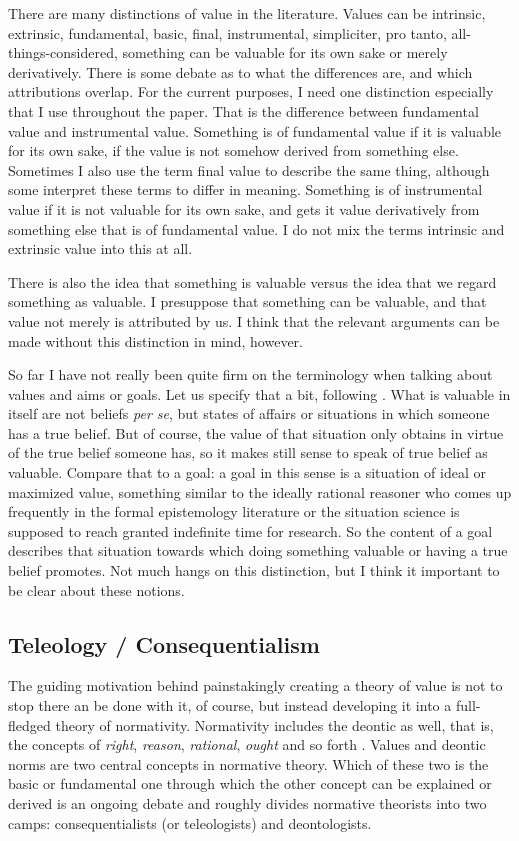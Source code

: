 \documentclass[12pt,numbers=noenddot]{scrartcl}
\begin{document}
There are many distinctions of value in the literature. Values can be intrinsic, extrinsic, fundamental, basic, final, instrumental, simpliciter, pro tanto, all-things-considered, something can be valuable for its own sake or merely derivatively. There is some debate as to what the differences are, and which attributions overlap. For the current purposes, I need one distinction especially that I use throughout the paper. That is the difference between fundamental value and instrumental value. Something is of fundamental value if it is valuable for its own sake, if the value is not somehow derived from something else. Sometimes I also use the term final value to describe the same thing, although some interpret these terms to differ in meaning. Something is of instrumental value if it is not valuable for its own sake, and gets it value derivatively from something else that is of fundamental value. I do not mix the terms intrinsic and extrinsic value into this at all.

There is also the idea that something is valuable versus the idea that we regard something as valuable. I presuppose that something can be valuable, and that value not merely is attributed by us. I think that the relevant arguments can be made without this distinction in mind, however.

So far I have not really been quite firm on the terminology when talking about values and aims or goals. Let us specify that a bit, following \textcite[344f.]{Berker2013-BERETA-2}. What is valuable in itself are not beliefs \emph{per se}, but states of affairs or situations in which someone has a true belief. But of course, the value of that situation only obtains in virtue of the true belief someone has, so it makes still sense to speak of true belief as valuable. Compare that to a goal: a goal in this sense is a situation of ideal or maximized value, something similar to the ideally rational reasoner who comes up frequently in the formal epistemology literature or the situation science is supposed to reach granted indefinite time for research. So the content of a goal describes that situation towards which doing something valuable or having a true belief promotes. Not much hangs on this distinction, but I think it important to be clear about these notions.

\subsection{ Teleology / Consequentialism} \label{subsec: teleology}
The guiding motivation behind painstakingly creating a theory of value is not to stop there an be done with it, of course, but instead developing it into a full-fledged theory of normativity. Normativity includes the deontic as well, that is, the concepts of \emph{right}, \emph{reason}, \emph{rational}, \emph{ought} and so forth \autocite[21]{sep-value-theory}. Values and deontic norms are two central concepts in normative theory. Which of these two is the basic or fundamental one through which the other concept can be explained or derived is an ongoing debate and roughly divides normative theorists into two camps: consequentialists (or teleologists) and deontologists. 
\end{document}
